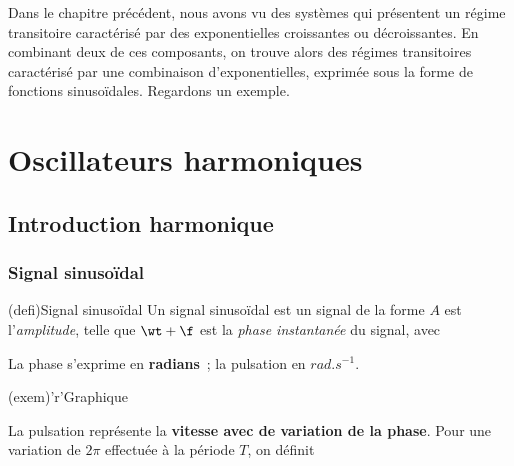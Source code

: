 \documentclass[../../main/main.tex]{subfiles}
\begin{document}
\newpage

Dans le chapitre précédent, nous avons vu des systèmes qui présentent un régime
transitoire caractérisé par des exponentielles croissantes ou décroissantes. En
combinant deux de ces composants, on trouve alors des régimes transitoires
caractérisé par une combinaison d'exponentielles, exprimée sous la forme de
fonctions sinusoïdales. Regardons un exemple.

\section{Oscillateurs harmoniques}
\subsection{Introduction harmonique}

\subsubsection{Signal sinusoïdal}

\begin{tcbraster}[raster columns=2, raster equal height=rows]
	\begin{tcb}[label=def:signsu](defi){Signal sinusoïdal}
		Un signal sinusoïdal est un signal de la forme
		\psw{
			\[
				\boxed{s(t) = A\cos(\wt + \f)}
			\]
		}
		$A$ est l'\textit{amplitude}, telle que
		\psw{
			\[
				A = \frac{s_{\max} - s_{\min}}{2}
			\]
		}
		$\wt +\f$ est la \textit{phase instantanée} du signal, avec
		\vspace*{-20pt}
		\begin{center}
		\end{center}
		La phase s'exprime en \textbf{radians}~; la pulsation en
		\textbf{$\si{rad.s^{-1}}$}.
	\end{tcb}
	\begin{tcb}[label=exem:graph](exem)'r'{Graphique}
		\begin{center}
		\end{center}
		La pulsation représente la \textbf{vitesse avec de variation de la phase}.
		Pour une variation de $2\pi$ effectuée à la période $T$, on définit
		\psw{
			\[
				\boxed{\w = 2\pi/T = 2\pi f}
			\]
		}
		\vspace{-15pt}
	\end{tcb}
\end{tcbraster}
\end{document}
